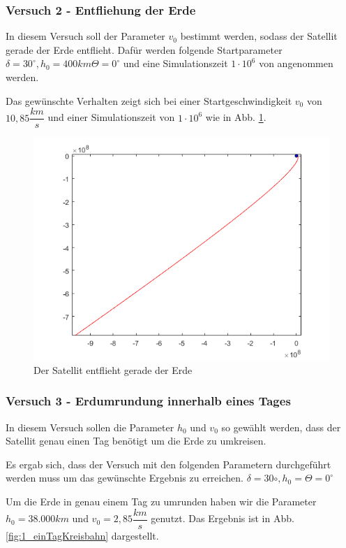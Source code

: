 \documentclass[]{scrartcl}
\begin{document}
\subsubsection{Versuch 2 - Entfliehung der Erde}
In diesem Versuch soll der Parameter $v_0$ bestimmt werden, sodass der Satellit gerade der Erde entflieht. Dafür werden folgende Startparameter 
 $\delta = 30^\circ, h_0 = 400km \Theta = 0^\circ $ und eine Simulationszeit $1 \cdot 10^6$ von angenommen werden.
 
 Das gewünschte Verhalten zeigt sich bei einer Startgeschwindigkeit $v_0$ von  $10,85 \dfrac{km}{s}$ und einer Simulationszeit von $1 \cdot 10^6$ wie in Abb. \ref{fig:1_Entfliehung}.
 
\begin{figure}[H]
\centering
\includegraphics[width=1\linewidth]{./1_entfliehung}
\caption{Der Satellit entflieht gerade der Erde}
\label{fig:1_Entfliehung}
\end{figure} 


\subsubsection{Versuch 3 - Erdumrundung innerhalb eines Tages}
In diesem Versuch sollen die Parameter $h_0$ und $v_0$ so gewählt werden, dass der Satellit genau einen Tag benötigt um die Erde zu umkreisen.

Es ergab sich, dass der Versuch mit den folgenden Parametern durchgeführt werden muss um das gewünschte Ergebnis zu erreichen.
 $\delta = 30\circ, h_0 =  \Theta = 0^\circ $ 
 
 Um die Erde in genau einem Tag zu umrunden haben wir die Parameter $h_0 = 38.000 km$ und $v_0 = 2,85 \dfrac{km}{s}$ genutzt. Das Ergebnis ist in Abb. \ref{fig:1_einTagKreisbahn} dargestellt.
\end{document}
